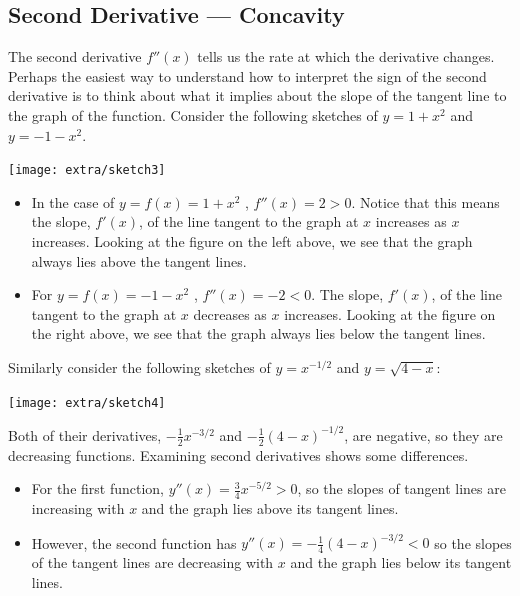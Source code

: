 \subsection{Second Derivative --- Concavity}\label{ssec_sketch_SD}
The second derivative $f''(x)$ tells us the rate at which the derivative changes. Perhaps
the easiest way to understand how to interpret the sign of the second derivative is to
think about what it implies about the slope of the tangent line to the graph of the
function. Consider the following sketches of $y=1+x^2$ and $y=-1-x^2$.
\begin{wfig}
 \begin{center}
  \texttt{[image: extra/sketch3]}
 \end{center}
\end{wfig}
\begin{itemize}
 \item In the case of $y = f(x) = 1+x^2$ , $f''(x) = 2 > 0$. Notice that this means the
slope, $f'(x)$, of the line tangent to the graph at $x$ increases as $x$ increases.
Looking at the figure on the left above, we see that the graph always lies above the
tangent lines.

\item For $y = f(x) = -1-x^2$ , $f''(x) = -2 < 0$. The slope, $f'(x)$, of the line
tangent to the graph at $x$ decreases as $x$ increases. Looking at the figure on the right
above, we see that the graph always lies below the tangent lines.
\end{itemize}
Similarly consider the following sketches of $y=x^{-1/2}$ and $y=\sqrt{4-x}$:
\begin{wfig}
 \begin{center}
  \texttt{[image: extra/sketch4]}
 \end{center}
\end{wfig}
Both of their derivatives, $-\frac{1}{2}x^{-3/2}$ and $-\frac{1}{2}(4-x)^{-1/2}$, are
negative, so they are decreasing functions. Examining second derivatives shows some
differences.
\begin{itemize}
 \item For the first function, $y''(x) = \frac{3}{4}x^{-5/2}>0$, so the slopes of tangent
lines are increasing with $x$ and the graph lies above its tangent lines.
\item However, the second function has $y''(x) = -\frac{1}{4}(4-x)^{-3/2}<0$ so the
slopes of the tangent lines are decreasing with $x$ and the graph lies below its tangent
lines.
\end{itemize}

